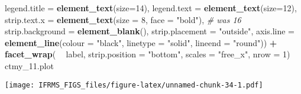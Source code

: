 \documentclass[
]{article}
\newenvironment{Shaded}{\begin{snugshade}}{\end{snugshade}}
\newcommand{\CommentTok}[1]{\textcolor[rgb]{0.56,0.35,0.01}{\textit{#1}}}
\newcommand{\DataTypeTok}[1]{\textcolor[rgb]{0.13,0.29,0.53}{#1}}
\newcommand{\DecValTok}[1]{\textcolor[rgb]{0.00,0.00,0.81}{#1}}
\newcommand{\FloatTok}[1]{\textcolor[rgb]{0.00,0.00,0.81}{#1}}
\newcommand{\KeywordTok}[1]{\textcolor[rgb]{0.13,0.29,0.53}{\textbf{#1}}}
\newcommand{\NormalTok}[1]{#1}
\newcommand{\OperatorTok}[1]{\textcolor[rgb]{0.81,0.36,0.00}{\textbf{#1}}}
\newcommand{\StringTok}[1]{\textcolor[rgb]{0.31,0.60,0.02}{#1}}
\begin{document}
\begin{Shaded}
\begin{Highlighting}[]
          \DataTypeTok{legend.title =} \KeywordTok{element_text}\NormalTok{(}\DataTypeTok{size=}\DecValTok{14}\NormalTok{), }
          \DataTypeTok{legend.text =} \KeywordTok{element_text}\NormalTok{(}\DataTypeTok{size=}\DecValTok{12}\NormalTok{),}
          \DataTypeTok{strip.text.x =} \KeywordTok{element_text}\NormalTok{(}\DataTypeTok{size =} \DecValTok{8}\NormalTok{, }\DataTypeTok{face =} \StringTok{"bold"}\NormalTok{), }\CommentTok{# was 16}
          \DataTypeTok{strip.background =} \KeywordTok{element_blank}\NormalTok{(),}
          \DataTypeTok{strip.placement =} \StringTok{"outside"}\NormalTok{,}
          \DataTypeTok{axis.line =} \KeywordTok{element_line}\NormalTok{(}\DataTypeTok{colour =} \StringTok{"black"}\NormalTok{, }\DataTypeTok{linetype =} \StringTok{"solid"}\NormalTok{, }\DataTypeTok{lineend =} \StringTok{"round"}\NormalTok{)) }\OperatorTok{+}
\StringTok{  }\KeywordTok{facet_wrap}\NormalTok{( }\OperatorTok{~}\StringTok{ }\NormalTok{label, }\DataTypeTok{strip.position =} \StringTok{"bottom"}\NormalTok{, }\DataTypeTok{scales =} \StringTok{"free_x"}\NormalTok{, }\DataTypeTok{nrow =} \DecValTok{1}\NormalTok{)}
\NormalTok{ctmy_}\FloatTok{11.}\NormalTok{plot}
\end{Highlighting}
\end{Shaded}

\texttt{[image: IFRMS\_FIGS\_files/figure-latex/unnamed-chunk-34-1.pdf]}

\begin{Shaded}
\end{Shaded}
\end{document}
